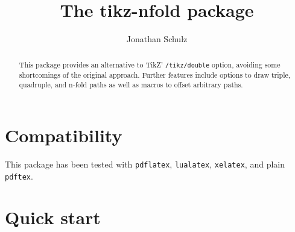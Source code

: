 \documentclass[12pt,a4paper]{article}
\theoremstyle{definition}
\begin{document}
\title{The \textsf{tikz-nfold} package}
\author{Jonathan Schulz}
\date{\monthname{} \the\year}

\maketitle

\begin{abstract}
  This package provides an alternative to TikZ' \verb|/tikz/double| option, avoiding some shortcomings of the original approach. Further features include options to draw triple, quadruple, and n-fold paths as well as macros to offset arbitrary paths.
\end{abstract}

\section*{Compatibility}
This package has been tested with \texttt{pdflatex}, \texttt{lualatex}, \texttt{xelatex}, and plain \texttt{pdftex}.

\section{Quick start}
\end{document}
